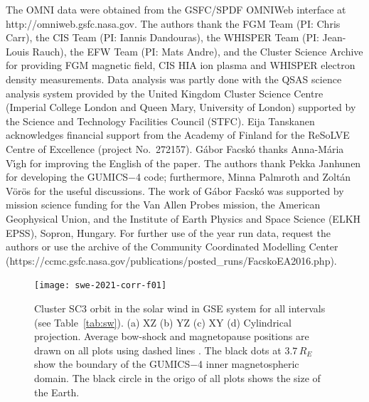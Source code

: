 \documentclass[linenumbers,draft]{agujournal}
\begin{document}
\begin{acknowledgments}
The OMNI data were obtained from the GSFC/SPDF OMNIWeb interface at http://omniweb.gsfc.nasa.gov. The authors thank the FGM Team (PI: Chris Carr), the CIS Team (PI: Iannis Dandouras), the WHISPER Team (PI: Jean-Louis Rauch), the EFW Team (PI: Mats Andre), and the Cluster Science Archive for providing FGM magnetic field, CIS HIA ion plasma and WHISPER electron density measurements. Data analysis was partly done with the QSAS science analysis system provided by the United Kingdom Cluster Science Centre (Imperial College London and Queen Mary, University of London) supported by the Science and Technology Facilities Council (STFC). Eija Tanskanen acknowledges financial support from the Academy of Finland for the ReSoLVE Centre of Excellence (project No.~272157). G{\'a}bor Facsk{\'o} thanks Anna-M\'aria V{\'\i{}}gh for improving the English of the paper. The authors thank Pekka Janhunen for developing the GUMICS$-$4 code; furthermore, Minna Palmroth and Zolt{\'a}n V{\"o}r{\"o}s for the useful discussions. The work of G{\'a}bor Facsk{\'o} was supported by mission science funding for the Van Allen Probes mission, the American Geophysical Union, and the Institute of Earth Physics and Space Science (ELKH EPSS), Sopron, Hungary. For further use of the year run data, request the authors or use the archive of the Community Coordinated Modelling Center (https://ccmc.gsfc.nasa.gov/publications/posted\_runs/FacskoEA2016.php).
\end{acknowledgments}






\pagebreak

\begin{figure}[h]
\centering
\texttt{[image: swe-2021-corr-f01]} 
\caption{Cluster SC3 orbit in the solar wind in GSE system for all intervals (see Table~\ref{tab:sw}). (a) XZ (b) YZ (c) XY (d) Cylindrical projection. Average bow-shock and magnetopause positions are drawn on all plots using dashed lines \citep[][respectively]{peredo95:_three_alfven_mach,tsyganenko95:_model_earth}. The black dots at $3.7\,R_E$ show the boundary of the GUMICS$-$4 inner magnetospheric domain. The black circle in the origo of all plots shows the size of the Earth.}
\label{fig:sworbit}
\end{figure}

\pagebreak
\end{document}
